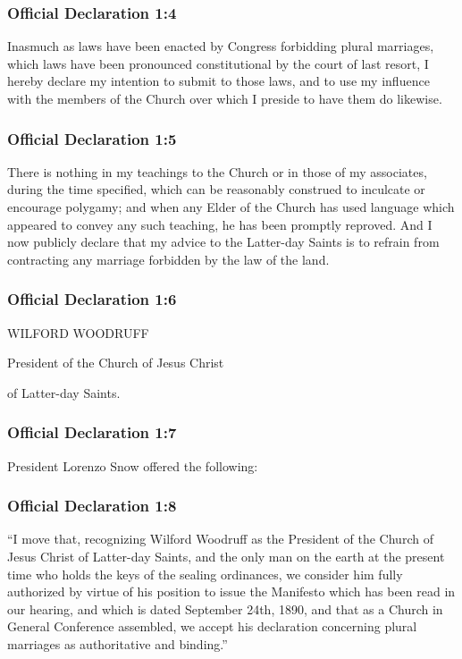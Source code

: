 	\subsubsection{Official Declaration 1:4} %
		\label{OD1-4}
		
		Inasmuch as laws have been enacted by Congress forbidding plural marriages, which laws have been pronounced constitutional by the court of last resort, I hereby declare my intention to submit to those laws, and to use my influence with the members of the Church over which I preside to have them do likewise.
		
	\subsubsection{Official Declaration 1:5} %
		\label{OD1-5}
		
		There is nothing in my teachings to the Church or in those of my associates, during the time specified, which can be reasonably construed to inculcate or encourage polygamy; and when any Elder of the Church has used language which appeared to convey any such teaching, he has been promptly reproved.  And I now publicly declare that my advice to the Latter-day Saints is to refrain from contracting any marriage forbidden by the law of the land.
		
	\subsubsection{Official Declaration 1:6} %
		\label{OD1-6}
		
		WILFORD WOODRUFF   	
		
		President of the Church of Jesus Christ  
			
		of Latter-day Saints.		
		
	\subsubsection{Official Declaration 1:7} %
		\label{OD1-7}
		
		President Lorenzo Snow offered the following:
		
	\subsubsection{Official Declaration 1:8} %
		\label{OD1-8}
		
		``I move that, recognizing Wilford Woodruff as the President of the Church of Jesus Christ of Latter-day Saints, and the only man on the earth at the present time who holds the keys of the sealing ordinances, we consider him fully authorized by virtue of his position to issue the Manifesto which has been read in our hearing, and which is dated September 24th, 1890, and that as a Church in General Conference assembled, we accept his declaration concerning plural marriages as authoritative and binding.''
		
